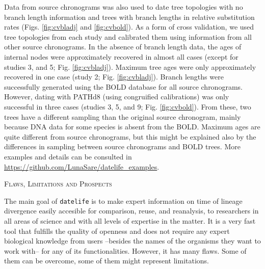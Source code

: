 \documentclass[]{article}
\begin{document}
Data from source chronograms was also used to date tree topologies with no branch length information and trees with branch lengths in relative substitution rates (Figs. \ref{fig:cvbladj} and \ref{fig:cvbold}). As a form of cross validation, we used tree topologies from each study and calibrated them using information from all other source chronograms. In the absence of branch length data, the ages of internal nodes were approximately recovered in almost all cases (except for studies 3, and 5; Fig. \ref{fig:cvbladj}). Maximum tree ages were only approximately recovered in one case (study 2; Fig. \ref{fig:cvbladj}).
Branch lengths were successfully generated using the BOLD database for all source chronograms. However, dating with PATHd8 (using congruified calibrations) was only successful in
three cases (studies 3, 5, and 9; Fig. \ref{fig:cvbold}). From these, two trees have a different sampling than the original source chronogram, mainly because DNA data for some species is absent from the BOLD. Maximum ages are quite different from source chronograms, but this might be explained also by the differences in sampling between source chronograms and BOLD trees.
More examples and details can be consulted in \url{https://github.com/LunaSare/datelife_examples}.

\begin{center}
\textsc{Flaws, Limitations and Prospects}
\end{center}

The main goal of \texttt{datelife} is to make expert information on time of lineage divergence easily accesible for comparison, reuse, and reanalysis, to researchers in all areas of science and with all levels of expertise in the matter. It is a very fast tool that fulfills the quality of openness and does not require any expert biological knowledge from users --besides the names of the organisms they want to work with-- for any of its functionalities. However, it has many flaws. Some of them can be overcome, some of them might represent limitations.
\end{document}
